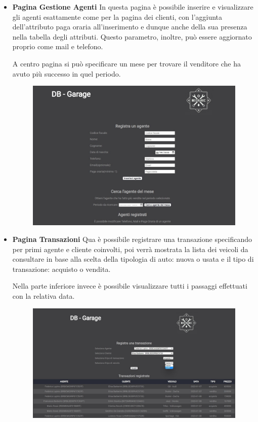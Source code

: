 \documentclass[a4paper,12pt]{report}
\begin{document}
\begin{itemize}
	\item \textbf{Pagina Gestione Agenti}
	In questa pagina è possibile inserire e visualizzare gli agenti esattamente come per la pagina dei clienti, con 
	l'aggiunta dell'attributo paga oraria all'inserimento e dunque anche della sua presenza nella tabella degli attributi.
	Questo parametro, inoltre, può essere aggiornato proprio come mail e telefono.
	
	A centro pagina si può specificare un mese per trovare il venditore che ha avuto più successo in quel periodo.
	\begin{figure}[H]
		\centering
		\includegraphics[scale=0.5]{img/agenti.jpg}
	\end{figure}

	\item \textbf{Pagina Transazioni}
	Qua è possibile registrare una transazione specificando per primi agente e cliente coinvolti, poi verrà mostrata la lista
	dei veicoli da consultare in base alla scelta della tipologia di auto: nuova o usata e il tipo di transazione: acquisto o vendita.
	
	Nella parte inferiore invece è possibile visualizzare tutti i passaggi effettuati con la relativa data.
	\begin{figure}[H]
		\centering
		\includegraphics[scale=0.46]{img/transazioni.jpg}
	\end{figure}

	
\end{itemize}
\end{document}
